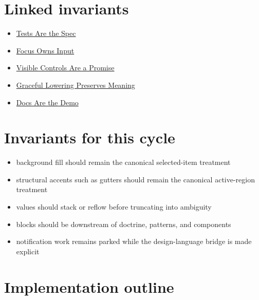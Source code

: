 \section{Linked invariants}\label{record-169-linked-invariants}

\begin{itemize}
\tightlist
\item
  \href{https://github.com/flyingrobots/bijou/blob/cbd70612140e7a450d764b3c7be1c6af878b99bc/docs/invariants/tests-are-the-spec.md}{Tests Are the Spec}
\item
  \href{https://github.com/flyingrobots/bijou/blob/cbd70612140e7a450d764b3c7be1c6af878b99bc/docs/invariants/focus-owns-input.md}{Focus Owns Input}
\item
  \href{https://github.com/flyingrobots/bijou/blob/cbd70612140e7a450d764b3c7be1c6af878b99bc/docs/invariants/visible-controls-are-a-promise.md}{Visible Controls Are a Promise}
\item
  \href{https://github.com/flyingrobots/bijou/blob/cbd70612140e7a450d764b3c7be1c6af878b99bc/docs/invariants/graceful-lowering-preserves-meaning.md}{Graceful Lowering Preserves Meaning}
\item
  \href{https://github.com/flyingrobots/bijou/blob/cbd70612140e7a450d764b3c7be1c6af878b99bc/docs/invariants/docs-are-the-demo.md}{Docs Are the Demo}
\end{itemize}

\section{Invariants for this cycle}\label{record-169-invariants-for-this-cycle}

\begin{itemize}
\tightlist
\item
  background fill should remain the canonical selected-item treatment
\item
  structural accents such as gutters should remain the canonical active-region treatment
\item
  values should stack or reflow before truncating into ambiguity
\item
  blocks should be downstream of doctrine, patterns, and components
\item
  notification work remains parked while the design-language bridge is made explicit
\end{itemize}

\section{Implementation outline}\label{record-169-implementation-outline}

